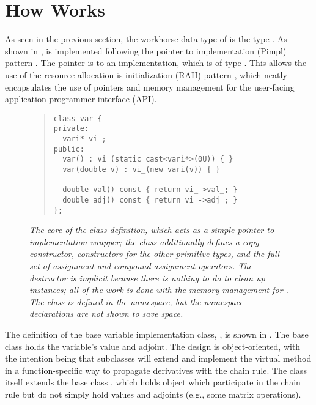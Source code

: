 \documentclass[10pt]{article}
\begin{document}
\section{How  Works}

As seen in the previous section, the workhorse data type of
 is the type .  As shown in
,  is implemented following the pointer
to implementation (Pimpl) pattern \citep{sutter:98,sutter:01}.  The
pointer is to an implementation, which is of type
.  This allows the use of the resource
allocation is initialization (RAII) pattern \citep{stroustrup:94},
which neatly encapsulates the use of pointers and memory management
for the user-facing application programmer interface
(API).

\begin{figure}
\begin{quote}\small
\begin{Verbatim}
class var {
private:
  vari* vi_;
public:
  var() : vi_(static_cast<vari*>(0U)) { }
  var(double v) : vi_(new vari(v)) { }

  double val() const { return vi_->val_; }
  double adj() const { return vi_->adj_; }  
};
\end{Verbatim}
\end{quote}
\vspace*{-12pt}
\caption{\small\it The core of the  class definition,
  which acts as a simple pointer to implementation wrapper; the class
  additionally defines a copy constructor, constructors for the other
  primitive types, and the full set of assignment and compound
  assignment operators.  The destructor is implicit because there is
  nothing to do to clean up instances; all of the work is done with
  the memory management for . The class is defined in the
   namespace, but the namespace declarations are not
  shown to save space.}\label{var-definition.figure}
\end{figure}

The definition of the base variable implementation class, ,
is shown in .  The base class holds the
variable's value and adjoint.  The design is object-oriented, with the
intention being that subclasses will extend  and implement the
virtual method  in a function-specific way to propagate
derivatives with the chain rule.  The class  itself extends
the base class , which holds object which participate
in the chain rule but do not simply hold values and adjoints (e.g.,
some matrix operations).
\end{document}
